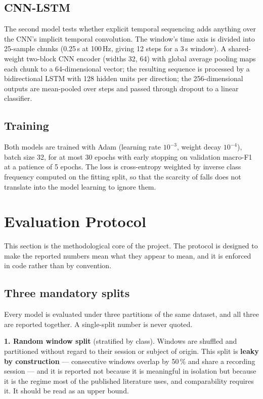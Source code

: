 \subsection{CNN-LSTM}

The second model tests whether explicit temporal sequencing adds anything
over the CNN's implicit temporal convolution. The window's time axis is
divided into 25-sample chunks (0.25\,s at 100\,Hz, giving 12 steps for a
3\,s window). A shared-weight two-block CNN encoder (widths 32, 64) with
global average pooling maps each chunk to a 64-dimensional vector; the
resulting sequence is processed by a bidirectional LSTM with 128 hidden
units per direction; the 256-dimensional outputs are mean-pooled over steps
and passed through dropout to a linear classifier.

\subsection{Training}

Both models are trained with Adam (learning rate $10^{-3}$, weight decay
$10^{-4}$), batch size 32, for at most 30 epochs with early stopping on
validation macro-F1 at a patience of 5 epochs. The loss is cross-entropy
weighted by inverse class frequency computed on the fitting split, so that
the scarcity of falls does not translate into the model learning to ignore
them.

\section{Evaluation Protocol}
\label{sec:evaluation-protocol}

This section is the methodological core of the project. The protocol is
designed to make the reported numbers mean what they appear to mean, and it
is enforced in code rather than by convention.

\subsection{Three mandatory splits}

Every model is evaluated under three partitions of the same dataset, and all
three are reported together. A single-split number is never quoted.

\textbf{1. Random window split} (stratified by class). Windows are shuffled
and partitioned without regard to their session or subject of origin. This
split is \textbf{leaky by construction} --- consecutive windows overlap by
50\,\% and share a recording session --- and it is reported not because it
is meaningful in isolation but because it is the regime most of the
published literature uses, and comparability requires it. It should be read
as an upper bound.

